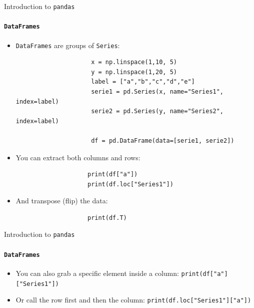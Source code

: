 \documentclass[notes,11pt, aspectratio=169, xcolor=table]{beamer}
\begin{document}
        \begin{frame}[fragile=singleslide]{Introduction to \texttt{pandas}}
        \framesubtitle{\texttt{DataFrames}}
            
             \begin{itemize}
    
                \item \texttt{DataFrames} are groups of \texttt{Series}:
    
                    \begin{verbatim}
                     x = np.linspace(1,10, 5)
                     y = np.linspace(1,20, 5)
                     label = ["a","b","c","d","e"]
                     serie1 = pd.Series(x, name="Series1", index=label)
                     serie2 = pd.Series(y, name="Series2", index=label)
                     
                     df = pd.DataFrame(data=[serie1, serie2])
                    \end{verbatim}
                    
                \item You can extract both columns and rows:
                
                \begin{verbatim}
                    print(df["a"])
                    print(df.loc["Series1"])
                \end{verbatim}

                \item And transpose (flip) the data:
                
                \begin{verbatim}
                    print(df.T)
                \end{verbatim}
                    
            \end{itemize}             

        \end{frame}    

        \begin{frame}[fragile=singleslide]{Introduction to \texttt{pandas}}
        \framesubtitle{\texttt{DataFrames}}
            
             \begin{itemize}
    
                \item You can also grab a specific element inside a column: \texttt{print(df["a"]["Series1"])}

                \item Or call the row first and then the column: \texttt{print(df.loc["Series1"]["a"])}
        
            \end{itemize}             

        \end{frame}    
\end{document}
